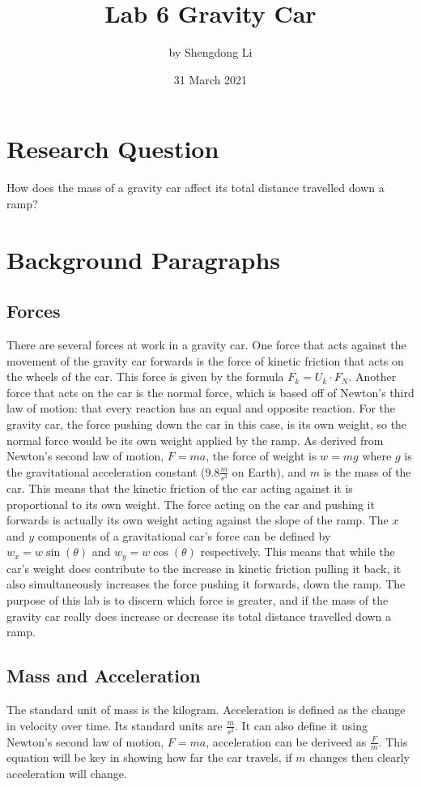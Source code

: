 \documentclass[12pt]{article}
\begin{document}
\title{Lab 6 Gravity Car}
\author{by Shengdong Li}
\date{31 March 2021}
\maketitle

\section{Research Question}

How does the mass of a gravity car affect its total distance travelled down a ramp?

\section{Background Paragraphs}

\subsection{Forces}
There are several forces at work in a gravity car. One force that acts against the movement of the gravity car forwards is the force of kinetic friction that acts on the wheels of the car. This force is given by the formula \(F_k=U_k\cdot F_N\). Another force that acts on the car is the normal force, which is based off of Newton's third law of motion: that every reaction has an equal and opposite reaction. For the gravity car, the force pushing down the car in this case, is its own weight, so the normal force would be its own weight applied by the ramp. As derived from Newton's second law of motion, \(F=ma\), the force of weight is \(w=mg\) where \(g\) is the gravitational acceleration constant (\(9.8\frac{m}{s^2}\) on Earth), and \(m\) is the mass of the car. This means that the kinetic friction of the car acting against it is proportional to its own weight. The force acting on the car and pushing it forwards is actually its own weight acting against the slope of the ramp. The \(x\) and \(y\) components of a gravitational car's force can be defined by \(w_x=w\sin(\theta)\) and \(w_y=w\cos(\theta)\) respectively.
This means that while the car's weight does contribute to the increase in kinetic friction pulling it back, it also simultaneously increases the force pushing it forwards, down the ramp. The purpose of this lab is to discern which force is greater, and if the mass of the gravity car really does increase or decrease its total distance travelled down a ramp.

\subsection{Mass and Acceleration}
The standard unit of mass is the kilogram. Acceleration is defined as the change in velocity over time. Its standard units are \(\frac{m}{s^{2}}\). It can also define it using Newton's second law of motion, \(F=ma\), acceleration can be deriveed as \(\frac{F}{m}\). This equation will be key in showing how far the car travels, if \(m\) changes then clearly acceleration will change.
\end{document}
